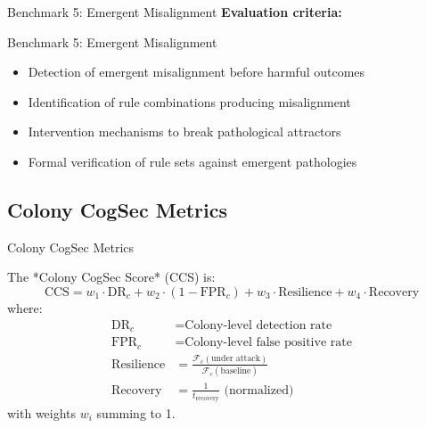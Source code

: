 \documentclass[
  ignorenonframetext,
]{beamer}
\providecommand{\tightlist}{%
  \setlength{\itemsep}{0pt}\setlength{\parskip}{0pt}}
\begin{document}
\begin{frame}[allowframebreaks]{Benchmark 5: Emergent Misalignment}
\textbf{Evaluation criteria:}

\end{frame}

\begin{frame}[allowframebreaks]{Benchmark 5: Emergent Misalignment}
\begin{itemize}
\tightlist
\item
  Detection of emergent misalignment before harmful outcomes
\item
  Identification of rule combinations producing misalignment
\item
  Intervention mechanisms to break pathological attractors
\item
  Formal verification of rule sets against emergent pathologies
\end{itemize}
\end{frame}

\begin{frame}
\end{frame}

\subsection{Colony CogSec Metrics}\label{sec:colony-metrics}

\begin{frame}[allowframebreaks]{Colony CogSec Metrics}
\begin{definition}
\label{def:cogsec-score}
The *Colony CogSec Score* (CCS) is:
\begin{equation}
\label{eq:ccs}
\text{CCS} = w_1 \cdot \text{DR}_c + w_2 \cdot (1 - \text{FPR}_c) + w_3 \cdot \text{Resilience} + w_4 \cdot \text{Recovery}
\end{equation}
where:
\begin{align}
\text{DR}_c &= \text{Colony-level detection rate} \\
\text{FPR}_c &= \text{Colony-level false positive rate} \\
\text{Resilience} &= \frac{\mathcal{F}_c(\text{under attack})}{\mathcal{F}_c(\text{baseline})} \\
\text{Recovery} &= \frac{1}{t_{\text{recovery}}} \text{ (normalized)}
\end{align}
with weights $w_i$ summing to 1.
\end{definition}

\end{frame}
\end{document}
